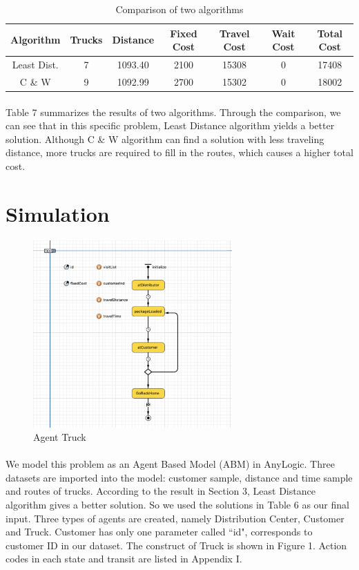 \documentclass[12pt]{article}
\numberwithin{equation}{section}
\begin{document}
	\begin{table}[htbp]
	\centering
	\caption{Comparison of two algorithms}
	\begin{tabular}{ccccccc}
	\hline
	Algorithm & Trucks & Distance & Fixed Cost & Travel Cost & Wait Cost & Total Cost\\
    \hline
    Least Dist.  & 7     & 1093.40 & 2100  & 15308 & 0     & 17408 \\
    C \& W & 9     & 1092.99 & 2700  & 15302 & 0     & 18002 \\
    \hline
    \end{tabular}%
  \label{tab:comparison}%
\end{table}%
		
	\paragraph{}Table 7 summarizes the results of two algorithms. Through the comparison, we can see that in this specific problem, Least Distance algorithm yields a better solution. Although C \& W algorithm can find a solution with less traveling distance, more trucks are required to fill in the routes, which causes a higher total cost.	

	
\section{Simulation}
	
	\begin{figure}[htbp]
	\centering \includegraphics[width=3in]{truck}
	\caption{Agent Truck}
	\end{figure}
	
	\paragraph{}We model this problem as an Agent Based Model (ABM) in AnyLogic. Three datasets are imported into the model: customer sample, distance and time sample and routes of trucks. According to the result in Section 3, Least Distance algorithm gives a better solution. So we used the solutions in Table 6 as our final input. Three types of agents are created, namely Distribution Center, Customer and Truck. Customer has only one parameter called ``id", corresponds to customer ID in our dataset. The construct of Truck is shown in Figure 1. Action codes in each state and transit are listed in Appendix I.
	
\end{document}
